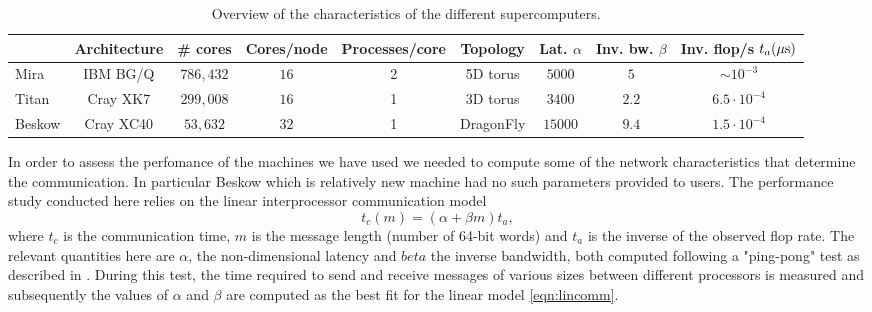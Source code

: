 \documentclass{sig-alternate}
\begin{document}
\begin{table}
\centering
\caption{Overview of the characteristics of the different supercomputers.}
\begin{tabular}{l|cccccccc} 
\hline
 & Architecture & \# cores & Cores/node & Processes/core & Topology & Lat.
 $\alpha$ & Inv. bw.  $\beta$ & Inv. flop/s $t_a (\unit[]{\mu s})$\\
 \hline
Mira & IBM BG/Q & $786,432$ & $16$ &2& 5D torus & $5000$ & $5$ & $\sim 10^{-3}$\\ 
Titan & Cray XK7 & $299,008$ & $16$ &1&3D torus& $3400$ & $2.2$ &$6.5 \cdot 10^{-4}$\\ %
Beskow & Cray XC40 & $53,632$ & $32$ &1&DragonFly & $15000$ & $9.4$ &$1.5 \cdot 10^{-4}$\\ %
\hline
\end{tabular}
\label{tab:computer_charac}
\end{table}

In order to assess the perfomance of the machines we have used we needed to compute some of the network characteristics that determine the communication. In particular Beskow which is relatively new machine had no such parameters provided to users. 
The performance study conducted here relies on the linear interprocessor communication  model
\begin{equation}
 t_c(m) = (\alpha + \beta m) t_a,\label{eqn:lincomm}
\end{equation}
where $t_c$ is the communication time, $m$ is the message length (number of 64-bit words) and $t_a$ is the inverse of the observed flop rate. The relevant quantities here are $\alpha$, the non-dimensional latency and $beta$ the inverse bandwidth, both computed following a "ping-pong" test as described in \cite{fischer:scaling}. During this test, the time required to send and receive messages of various sizes between different processors is measured and subsequently the values of $\alpha$ and $\beta$ are computed as the best fit for the linear model \ref{eqn:lincomm}.
\end{document}
